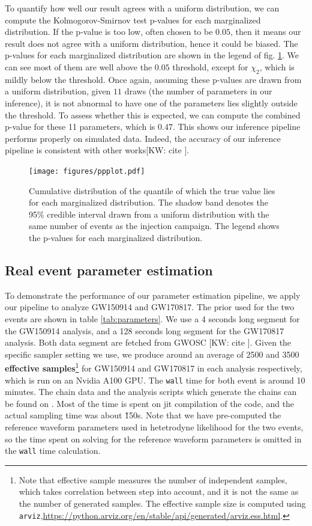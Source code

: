 \documentclass[twocolumn]{aastex631}
\newcommand{\kw}[1]{{\color{rb4}[KW: #1 ]}}
\begin{document}
To quantify how well our result agrees with a uniform distribution, we can
compute the Kolmogorov-Smirnov test p-values for each marginalized distribution.
If the p-value is too low, often chosen to be $0.05$, then it means our result
does not agree with a uniform distribution, hence it could be biased. The
p-values for each marginalized distribution are shown in the legend of fig.
\ref{fig:ppplot}. We can see most of them are well above the $0.05$ threshold,
except for $\chi_2$, which is mildly below the threshold. Once again, assuming
these p-values are drawn from a uniform distribution, given $11$ draws (the
number of parameters in our inference), it is not abnormal to have one of the
parameters lies slightly outside the threshold. To assess whether this is
expected, we can compute the combined p-value for these 11 parameters, which is $0.47$.
This shows our inference pipeline performs properly on simulated data.
Indeed, the accuracy of our inference pipeline is consistent with other works\kw{cite}.

\begin{figure}
    \texttt{[image: figures/ppplot.pdf]}
    \caption{Cumulative distribution of the quantile of which the true value
    lies for each marginalized distribution. The shadow band denotes the 95\%
    credible interval drawn from a uniform distribution with the same number of
    events as the injection campaign. The legend shows the p-values for each
    marginalized distribution.}
    \label{fig:ppplot}
    \end{figure}

\subsection{Real event parameter estimation}

To demonstrate the performance of our parameter estimation pipeline, we apply
our pipeline to analyze GW150914 and GW170817. The prior used for the two events
are shown in table \ref{tab:parameters}. We use a 4 seconds long segment for the
GW150914 analysis, and a 128 seconds long segment for the GW170817 analysis.
Both data segment are fetched from GWOSC \kw{cite}. Given the specific sampler
setting we use, we produce around an average of 2500 and 3500 \textbf{effective
samples}\footnote{Note that effective sample measures the number of independent
samples, which takes correlation between step into account, and it is not the
same as the number of generated samples. The effective sample size is computed
using
\texttt{arviz},\url{https://python.arviz.org/en/stable/api/generated/arviz.ess.html}.}
for GW150914 and GW170817 in each analysis respectively, which is run on an
Nvidia A100 GPU. The \texttt{wall} time for both event is around 10 minutes. The
chain data and the analysis scripts which generate the chains can be found on
. Most of the time is spent on jit compilation of the code, and the actual
sampling time was about \~150s. Note that we have pre-computed the reference
waveform parameters used in hetetrodyne likelihood for the two events, so the
time spent on solving for the reference waveform parameters is omitted in the
\texttt{wall} time calculation.
\end{document}
